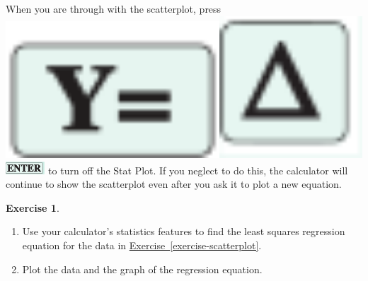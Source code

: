 \documentclass[10pt,]{book}
\theoremstyle{plain}
\theoremstyle{definition}
\newtheorem{exercise}[theorem]{Exercise}
\theoremstyle{definition}
\numberwithin{equation}{section}
\begin{document}
        When you are through with the scatterplot, press \includegraphics[width=0.6\textwidth,]{images/y-equals.svg}\includegraphics[width=0.4\textwidth,]{images/icon-up.svg}\includegraphics[width=0.11\textwidth,]{images/icon-enter.svg} to turn off the Stat Plot. If you neglect to do this, the calculator will continue to show the scatterplot even after
you ask it to plot a new equation.
\begin{exercise}\label{exercise-GC-regression}
\leavevmode%
\begin{enumerate}[label=*\alph**]
\item\hypertarget{li-216}{}
            Use your calculator’s statistics features to find the least squares regression equation for the data in \hyperref[exercise-scatterplot]{Exercise~\ref{exercise-scatterplot}}.
        \item\hypertarget{li-217}{}
            Plot the data and the graph of the regression equation.
        \end{enumerate}
\end{exercise}
\typeout{************************************************}
\typeout{************************************************}
\end{document}
